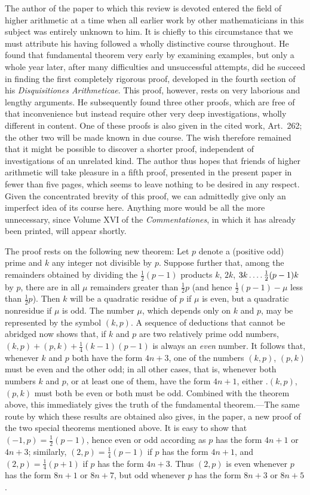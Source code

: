 The author of the paper to which this review is devoted entered the field of higher arithmetic at a time when all earlier work by other mathematicians in this subject was entirely unknown to him. It is chiefly to this circumstance that we must attribute his having followed a wholly distinctive course throughout. He found that fundamental theorem very early by examining examples, but only a whole year later, after many difficulties and unsuccessful attempts, did he succeed in finding the first completely rigorous proof, developed in the fourth section of his \emph{Disquisitiones Arithmeticae}. This proof, however, rests on very laborious and lengthy arguments. He subsequently found three other proofs, which are free of that inconvenience but instead require other very deep investigations, wholly different in content. One of these proofs is also given in the cited work, Art.~262; the other two will be made known in due course. The wish therefore remained that it might be possible to discover a shorter proof, independent of investigations of an unrelated kind. The author thus hopes that friends of higher arithmetic will take pleasure in a fifth proof, presented in the present paper in fewer than five pages, which seems to leave nothing to be desired in any respect. Given the concentrated brevity of this proof, we can admittedly give only an imperfect idea of its course here. Anything more would be all the more unnecessary, since Volume XVI of the \emph{Commentationes}, in which it has already been printed, will appear shortly.

The proof rests on the following new theorem: Let $p$ denote a (positive odd) prime and $k$ any integer not divisible by $p$. Suppose further that, among the remainders obtained by dividing the $\frac12(p-1)$ products $k$, $2k$, $3k\mathinner{.\,.\,.\,.}\frac12(p-1)k$ by $p$, there are in all $\mu$ remainders greater than $\frac12p$ (and hence $\frac12(p-1)-\mu$ less than $\frac12p$). Then $k$ will be a quadratic residue of $p$ if $\mu$ is even, but a quadratic nonresidue if $\mu$ is odd. The number $\mu$, which depends only on $k$
%
and $p$, may be represented by the symbol $(k,p)$. A sequence of deductions that cannot be abridged now shows that, if $k$ and $p$ are two relatively prime odd numbers, $(k,p)+(p,k)+\frac14(k-1)(p-1)$ is always an \emph{even} number. It follows that, whenever $k$ and $p$ both have the form $4n+3$, one of the numbers $(k,p)$, $(p,k)$ must be even and the other odd; in all other cases, that is, whenever both numbers $k$ and $p$, or at least one of them, have the form $4n+1$, either .$(k,p)$, $(p,k)$ must both be even or both must be odd. Combined with the theorem above, this immediately gives the truth of the fundamental theorem.---The same route by which these results are obtained also gives, in the paper, a new proof of the two special theorems mentioned above. It is easy to show that $(-1,p)=\frac12(p-1)$, hence even or odd according as $p$ has the form $4n+1$ or $4n+3$; similarly, $(2,p)=\frac14(p-1)$ if $p$ has the form $4n+1$, and $(2,p)=\frac14(p+1)$ if $p$ has the form $4n+3$. Thus $(2,p)$ is even whenever $p$ has the form $8n+1$ or $8n+7$, but odd whenever $p$ has the form $8n+3$ or $8n+5$.
